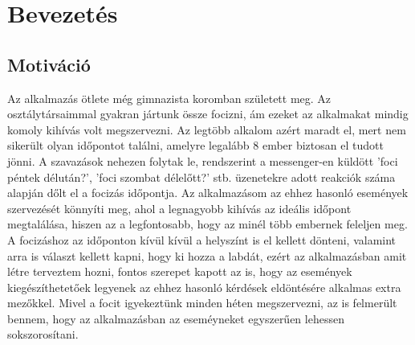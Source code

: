 \documentclass[a4paper,12pt]{report}
\theoremstyle{definition}
\theoremstyle{remark}
\begin{document}
\begin{abstract}

{\bf Feladat leírása:}
A projekt célja egy eseményszervezést segítő webalkalmazás létrehozása, amely segítségével rugalmasan lehet baráti társaságok összejöveteleit megszervezni. Az alkalmazásnak felhaználóbarátnak kell lennie, valamit az gondoskodnia kell a felhasználók adatainak alapvető biztonságáról. 

{\bf A feladat megvalósítása:}
Létrehoztam egy Angular keretrendszerben megvalósított webalkalmazást, amely az általam Spring Boot keretrendszerben írt API-t használja REST végpontokon keresztül. Az eseményszervezéshez szükséges logikát a backend oldalon valósítottam meg, a frontend oldali webalkalmazásnak csak a felhasználóval folytatott interakciókban van szerepe.

{\bf Elért eredmények:}
Az alkalmazás használatával eseményeket lehet létrehozni, lehetőség van azok konfigurációjára és sokszorosítására. Az eseményekhez más felhasználók is adhatók, az általuk adott visszajelzésekről könnyen értelmezhető statisztikákat kap az esemény szervezője. Az események adatainak véglegesítéséről a felhasználók alkalmazáson belüli üzenetben értesülnek.

{\bf Kulcsszavak:} alkalmazás, eseményszervezés, frontend, backend, Angular, Spring Boot
\end{abstract}

\newpage

\pagebreak

\tableofcontents
\pagebreak


\chapter{Bevezetés}

\section{Motiváció}

Az alkalmazás ötlete még gimnazista koromban született meg. Az osztálytársaimmal gyakran jártunk össze focizni, ám ezeket az alkalmakat mindig komoly kihívás volt megszervezni. Az legtöbb alkalom azért maradt el, mert nem sikerült olyan időpontot találni, amelyre legalább 8 ember biztosan el tudott jönni. A szavazások nehezen folytak le, rendszerint a messenger-en küldött 'foci péntek délután?', 'foci szombat délelőtt?' stb. üzenetekre adott reakciók száma alapján dőlt el a focizás időpontja. Az alkalmazásom az ehhez hasonló események szervezését könnyíti meg, ahol a legnagyobb kihívás az ideális időpont megtalálása, hiszen az a legfontosabb, hogy az minél több embernek feleljen meg. A focizáshoz az időponton kívül kívül a helyszínt is el kellett dönteni, valamint arra is választ kellett kapni, hogy ki hozza a labdát, ezért az alkalmazásban amit létre terveztem hozni, fontos szerepet kapott az is, hogy az események kiegészíthetetőek legyenek az ehhez hasonló kérdések eldöntésére alkalmas extra mezőkkel. Mivel a focit igyekeztünk minden héten megszervezni, az is felmerült bennem, hogy az alkalmazásban az eseméyneket egyszerűen lehessen sokszorosítani.
\end{document}
